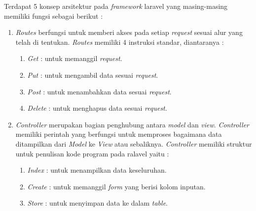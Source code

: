 Terdapat 5 konsep arsitektur pada \textit{framework} laravel yang masing-masing memiliki fungsi sebagai berikut \cite{6} :

\begin{enumerate}

\item \textit{Routes} berfungsi untuk memberi akses pada setiap \textit{request} sesuai alur yang telah di tentukan. \textit{Routes} memiliki 4 instruksi standar, diantaranya :

\begin{enumerate}

\item \textit{Get}	\hspace{0.6cm}: untuk memanggil \textit{request}.

\item \textit{Put}	\hspace{0.65cm}: untuk mengambil data sesuai \textit{request}.

\item \textit{Post}	\hspace{0.48cm}: untuk menambahkan data sesuai \textit{request}.

\item \textit{Delete} \hspace{0.12cm}: untuk menghapus data sesuai \textit{request}.
\end{enumerate}

\item \textit{Controller} merupakan bagian penghubung antara \textit{model} dan \textit{view}. \textit{Controller} memiliki perintah yang berfungsi untuk memproses bagaimana data ditampilkan dari \textit{Model} ke \textit{View} atau sebaliknya. \textit{Controller} memiliki struktur untuk penulisan kode program pada ralavel yaitu :

\begin{enumerate}

\item \textit{Index}	\hspace{0.34cm}: untuk menampilkan data keseluruhan.

\item \textit{Create} \hspace{0.2cm}: untuk memanggil \textit{form} yang berisi kolom inputan.

\item \textit{Store}	\hspace{0.4cm}: untuk menyimpan data ke dalam \textit{table}.


\end{enumerate}
\end{enumerate}
